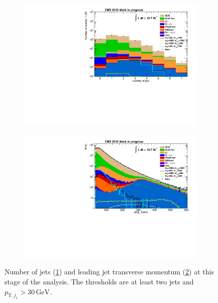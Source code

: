 \begin{figure}[htb!]
  \centering
  \begin{subfigure}[b]{0.495\textwidth}
    \centering
    \includegraphics[width=\textwidth]{plots/jet_n.pdf}
    \caption{\label{fig:jetn}}
  \end{subfigure}
  \begin{subfigure}[b]{0.495\textwidth}
    \centering
    \includegraphics[width=\textwidth]{plots/jetpt1.pdf}
    \caption{\label{fig:jetpt1}}
  \end{subfigure}
  \caption{Number of jets (\ref{fig:jetn}) and leading jet transverse momentum (\ref{fig:jetpt1}) at this stage of the analysis. The thresholds are at least two jets and $p_{\text{T}, j_1} > 30\,\text{GeV}$.}
  \label{fig:jetqualy}
\end{figure}

